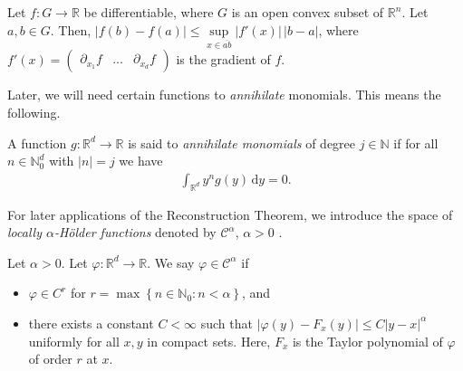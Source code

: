\begin{theorem}\label{mean-value-inequality}
    Let $f: G \to \mathbb{R}$ be differentiable, where $G$ is an open convex subset of $\mathbb{R}^n$. Let $a,b \in G$. Then, $|f(b) - f(a)| \leq \sup\limits_{x \in \overline{ab}} |f'(x)| \, |b-a|$, where $f'(x) = \begin{pmatrix}
        \partial_{x_1}f & ... & \partial_{x_d}f
    \end{pmatrix}$ is the gradient of $f$. 
\end{theorem}

Later, we will need certain functions to \emph{annihilate} monomials. This means the following.

\begin{definition}
    A function $g: \mathbb{R}^d \to \mathbb{R}$ is said to \emph{annihilate monomials} of degree $j \in \mathbb{N}$ if for all $n \in \mathbb{N}^d_0$ with $|n| = j$ we have
    \begin{align*}
        \int_{\mathbb{R}^d} y^n g (y) \, \mathrm{d}y = 0.
    \end{align*}
\end{definition}

For later applications of the Reconstruction Theorem, we introduce the space of \emph{locally $\alpha$-Hölder functions} denoted by $\mathcal{C}^\alpha$, $\alpha > 0$ . 

\begin{definition}
    Let $\alpha > 0$. Let $\varphi: \mathbb{R}^d \to \mathbb{R}$. We say $\varphi \in \mathcal{C}^\alpha$ if
\begin{itemize}
    \item $\varphi \in C^r$ for $r = \max\left\{ n \in \mathbb{N}_0 : n < \alpha \right\}$, and
    \item there exists a constant $C < \infty$ such that $|\varphi(y) - F_x(y)| \leq C |y-x|^\alpha$ uniformly for all $x,y$ in compact sets. Here, $F_x$ is the Taylor polynomial of $\varphi$ of order $r$ at $x$.   
\end{itemize}
\end{definition}


















